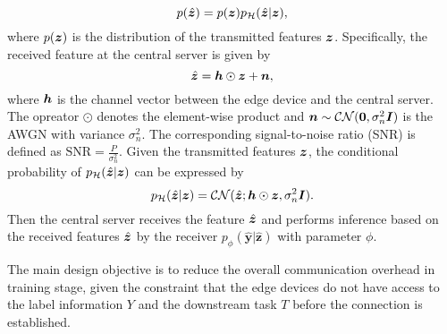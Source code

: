 \begin{equation}
    p(\hat{\boldsymbol{z}}) = p({\boldsymbol{z}})p_{\mathcal{H}}(\hat{\boldsymbol{z}}|{\boldsymbol{z}}),
\end{equation}
where $p(\boldsymbol{z})$ is the distribution of the transmitted features $\boldsymbol{z}$. Specifically, the received feature at the central server is given by
\begin{equation}
    \hat{\boldsymbol{z}} = \boldsymbol{h} \odot \boldsymbol{z} + \boldsymbol{n},
\end{equation}
where $\boldsymbol{h}$ is the channel vector between the edge device and the central server. The opreator $\odot$ denotes the element-wise product and $\boldsymbol{n}\sim \mathcal{CN}(\boldsymbol{0},\sigma_n^2\boldsymbol{I})$ is the AWGN with variance $\sigma_n^2$. The corresponding signal-to-noise ratio (SNR) is defined as $\text{SNR} = \frac{P}{\sigma_n^2}$. Given the transmitted features $\boldsymbol{z}$, the conditional probability of $p_{\mathcal{H}}(\hat{\boldsymbol{z}}|\boldsymbol{z})$ can be expressed by
\begin{equation}
    p_{\mathcal{H}}(\hat{\boldsymbol{z}}|{\boldsymbol{z}}) = \mathcal{CN}(\hat{\boldsymbol{z}};\boldsymbol{h}\odot{\boldsymbol{z}},\sigma_n^2\boldsymbol{I}).
\end{equation}
Then the central server receives the feature $\hat{\boldsymbol{z}}$ and performs inference based on the received features $\hat{\boldsymbol{z}}$ by the receiver $p_{\phi}(\hat{\boldsymbol{y}}|\hat{\boldsymbol{z}})$ with parameter $\phi$. 


The main design objective is to reduce the overall communication overhead in training stage, given the constraint that the edge devices do not have access to the label information $Y$ and the downstream task $T$ before the connection is established. 




